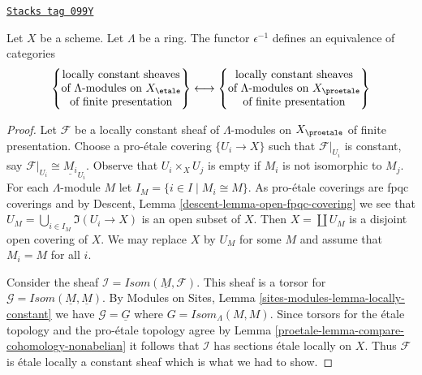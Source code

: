 \begin{lemma}
\label{proetale-lemma-compare-locally-constant}
\href{https://stacks.math.columbia.edu/tag/099Y}{\texttt{Stacks tag 099Y}}

Let $X$ be a scheme. Let $\Lambda$ be a ring.
The functor $\epsilon^{-1}$ defines an equivalence of categories
$$
\left\{
\begin{matrix}
\text{locally constant sheaves}\\
\text{of }\Lambda\text{-modules on }X_\etale\\
\text{of finite presentation}
\end{matrix}
\right\}
\longleftrightarrow
\left\{
\begin{matrix}
\text{locally constant sheaves}\\
\text{of }\Lambda\text{-modules on }X_\proetale\\
\text{of finite presentation}
\end{matrix}
\right\}
$$
\end{lemma}

\begin{proof}

Let $\mathcal{F}$ be a locally constant sheaf of $\Lambda$-modules
on $X_\proetale$ of finite presentation. Choose a pro-\'etale covering
$\{U_i \to X\}$ such that $\mathcal{F}|_{U_i}$ is constant, say
$\mathcal{F}|_{U_i} \cong \underline{M_i}_{U_i}$.
Observe that $U_i \times_X U_j$ is empty if $M_i$ is not isomorphic
to $M_j$.
For each $\Lambda$-module $M$ let $I_M = \{i \in I \mid M_i \cong M\}$.
As pro-\'etale coverings are fpqc coverings and by
Descent, Lemma \ref{descent-lemma-open-fpqc-covering}
we see that $U_M = \bigcup_{i \in I_M} \Im(U_i \to X)$
is an open subset of $X$. Then $X = \coprod U_M$ is a disjoint
open covering of $X$. We may replace $X$ by $U_M$ for some $M$ and
assume that $M_i = M$ for all $i$.

\medskip\noindent
Consider the sheaf $\mathcal{I} = \mathit{Isom}(\underline{M}, \mathcal{F})$.
This sheaf is a torsor for
$\mathcal{G} = \mathit{Isom}(\underline{M}, \underline{M})$.
By Modules on Sites, Lemma \ref{sites-modules-lemma-locally-constant}
we have $\mathcal{G} = \underline{G}$
where $G = \mathit{Isom}_\Lambda(M, M)$.
Since torsors for the \'etale topology
and the pro-\'etale topology agree by
Lemma \ref{proetale-lemma-compare-cohomology-nonabelian}
it follows that $\mathcal{I}$ has sections \'etale locally on $X$.
Thus $\mathcal{F}$ is \'etale locally a constant sheaf which is
what we had to show.
\end{proof}

